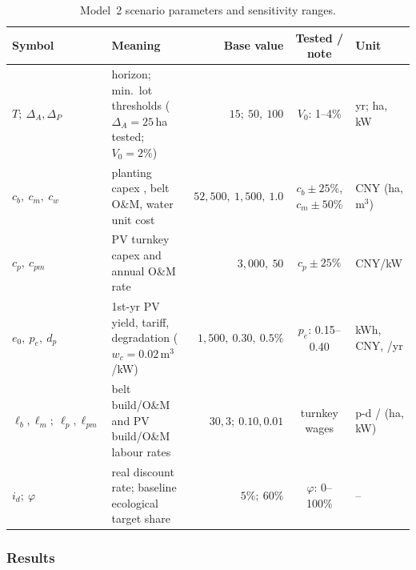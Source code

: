 \begin{table}[H]
\centering\small
\caption{Model~2 scenario parameters and sensitivity ranges.}
\label{tab:m2-par}
\renewcommand{\arraystretch}{1.06}
\begin{tabularx}{\linewidth}{@{}l X r c l@{}}
\toprule
Symbol & Meaning & Base value & Tested / note & Unit \\
\midrule
$T;\ \Delta_A,\Delta_P$ & horizon; min.\ lot thresholds ($\Delta_A=25$\,ha tested; $V_0=2\%$) & $15;\ 50,\ 100$ & $V_0$: 1--4\% & yr; ha, kW \\
$c_b,\ c_m,\ c_w$ & planting capex \cite{REF20}, belt O\&M, water unit cost & $52{,}500,\ 1{,}500,\ 1.0$ & $c_b\pm25\%$, $c_m\pm50\%$ & CNY (ha, m$^3$) \\
$c_p,\ c_{pm}$ & PV turnkey capex and annual O\&M rate & $3{,}000,\ 50$ & $c_p\pm25\%$ & CNY/kW \\
$e_0,\ p_e,\ d_p$ & 1st-yr PV yield, tariff, degradation \cite{EN06} ($w_c=0.02$\,m$^3$/kW) & $1{,}500,\ 0.30,\ 0.5\%$ & $p_e$: 0.15--0.40 & kWh, CNY, /yr \\
$\ell_b,\ell_m;\ \ell_p,\ell_{pm}$ & belt build/O\&M and PV build/O\&M labour rates & $30,3;\ 0.10,0.01$ & turnkey wages & p-d / (ha, kW) \\
$i_d;\ \varphi$ & real discount rate; baseline ecological target share & $5\%;\ 60\%$ & $\varphi$: 0--100\% & -- \\
\bottomrule
\end{tabularx}
\end{table}

\subsubsection[15-Year Plan and Effects of Tariffs and Seedling Cover]{Results}
